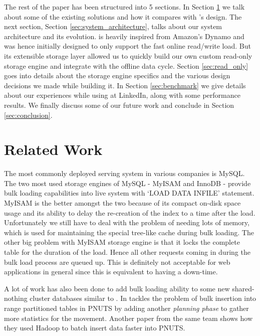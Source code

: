 \documentclass[10pt,twocolumn,preprint,nonatbib,numbers]{sigplanconf}
\begin{document}
The rest of the paper has been structured into 5 sections. In Section \ref{sec:related_work} we talk about some of the existing solutions and how it compares with \projectname{}'s design. The next section, Section \ref{sec:system_architecture},  talks about our system architecture and its evolution. \projectname{} is heavily inspired from Amazon's Dynamo\cite{dynamo} and was hence initially designed to only support the fast online read/write load. But its extensible storage layer allowed us to quickly build our own custom read-only storage engine and integrate with the offline data cycle. Section \ref{sec:read_only} goes into details about the storage engine specifics and the various design decisions we made while building it. In Section \ref{sec:benchmark} we give details about our experiences while using \projectname{} at LinkedIn, along with some performance results. We finally discuss some of our future work and conclude in Section \ref{sec:conclusion}. 


\section{Related Work}
\label{sec:related_work}
The most commonly deployed serving system in various companies is MySQL. The two most used storage engines of MySQL - MyISAM and InnoDB - provide bulk loading capabilities into live system with `LOAD DATA INFILE' statement. MyISAM is the better amongst the two because of its compact on-disk space usage and its ability to delay the re-creation of the index to a time after the load\cite{bulk}.  Unfortunately we still have to deal with the problem of needing lots of memory, which is used for maintaining the special tree-like cache during bulk loading. 
The other big problem with MyISAM storage engine is that it locks the complete table for the duration of the load. Hence all other requests coming in during the bulk load process are queued up. This is definitely not acceptable for web applications in general since this is equivalent to having a down-time.  

A lot of work has also been done to add bulk loading ability to some new shared-nothing cluster\cite{sharednothing} databases similar to \projectname{}. In \cite{silberstein} tackles the problem of bulk insertion into range partitioned tables in PNUTS \cite{pnuts} by adding another \emph {planning phase} to gather more statistics for the movement. Another paper from the same team \cite{pnutsbatch} shows how they used Hadoop to batch insert data faster into PNUTS.
\end{document}
